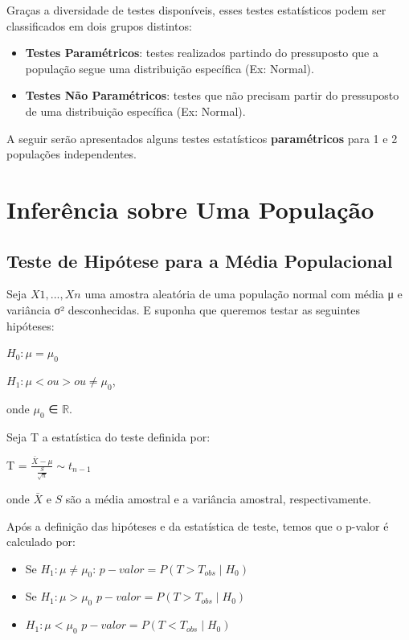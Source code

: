 \documentclass[
  letterpaper,
  DIV=11,
  numbers=noendperiod]{scrreprt}
\begin{document}
Graças a diversidade de testes disponíveis, esses testes estatísticos
podem ser classificados em dois grupos distintos:

\begin{itemize}
\item
  \textbf{Testes Paramétricos}: testes realizados partindo do
  pressuposto que a população segue uma distribuição específica (Ex:
  Normal).
\item
  \textbf{Testes Não Paramétricos}: testes que não precisam partir do
  pressuposto de uma distribuição específica (Ex: Normal).
\end{itemize}

A seguir serão apresentados alguns testes estatísticos
\textbf{paramétricos} para 1 e 2 populações independentes.


\hypertarget{inferuxeancia-sobre-uma-populauxe7uxe3o}{%
\chapter{Inferência sobre Uma
População}\label{inferuxeancia-sobre-uma-populauxe7uxe3o}}

\hypertarget{teste-de-hipuxf3tese-para-a-muxe9dia-populacional}{%
\section{Teste de Hipótese para a Média
Populacional}\label{teste-de-hipuxf3tese-para-a-muxe9dia-populacional}}

Seja \(X1, . . . , Xn\) uma amostra aleatória de uma população normal
com média μ e variância σ² desconhecidas. E suponha que queremos testar
as seguintes hipóteses:

\(H_{0} : \mu = \mu_{0}\)

\(H_{1} : \mu < ou > ou \neq \mu_{0}\),

onde \(\mu_{0}\) ∈ \(\mathbb{R}\).

Seja T a estatística do teste definida por:

T = \(\frac{\bar{X}-\mu}{\frac{S}{\sqrt{n}}} \sim t_{n-1}\)

onde \(\bar{X}\) e \(S\) são a média amostral e a variância amostral,
respectivamente.

Após a definição das hipóteses e da estatística de teste, temos que o
p-valor é calculado por:

\begin{itemize}
\item
  Se \(H_{1}: \mu \neq \mu_{0}\):
  \(p-valor = P (T > T_{obs}\mid H_{0})\)
\item
  Se \(H_{1}: \mu > \mu_{0}\) \(p-valor = P (T > T_{obs}\mid H_{0})\)
\item
  \(H_{1}: \mu < \mu_{0}\) \(p-valor = P (T < T_{obs}\mid H_{0})\)
\end{itemize}
\end{document}
